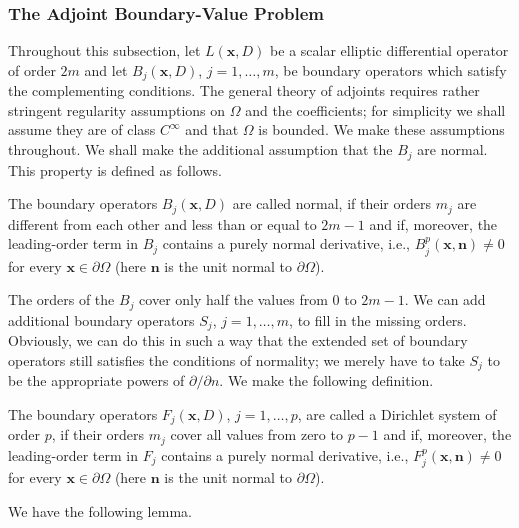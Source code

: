 \subsubsection{The Adjoint Boundary-Value Problem}\label{subsec:adjoint-boundary-value-problem}

Throughout this subsection, let $L(\bm{x},D)$ be a scalar elliptic differential operator of order $2m$ and let $B_j(\bm{x},D)$, $j=1,\ldots,m$, be boundary operators which satisfy the complementing conditions. The general theory of adjoints requires rather stringent regularity assumptions on $\Omega$ and the coefficients; for simplicity we shall assume they are of class $C^\infty$ and that $\Omega$ is bounded. We make these assumptions throughout. We shall make the additional assumption that the $B_j$ are normal. This property is defined as follows.

\begin{Definition}
\label{def:normal-boundary-operators}
The boundary operators $B_j(\bm{x},D)$ are called normal, if their orders $m_j$ are different from each other and less than or equal to $2m-1$ and if, moreover, the leading-order term in $B_j$ contains a purely normal derivative, i.e., $B_j^p(\bm{x},\bm{n})\ne0$ for every $\bm{x}\in\partial\Omega$ (here $\bm{n}$ is the unit normal to $\partial\Omega$).
\end{Definition}

The orders of the $B_j$ cover only half the values from $0$ to $2m-1$. We can add additional boundary operators $S_j$, $j=1,\ldots,m$, to fill in the missing orders. Obviously, we can do this in such a way that the extended set of boundary operators still satisfies the conditions of normality; we merely have to take $S_j$ to be the appropriate powers of $\partial/\partial n$. We make the following definition.

\begin{Definition}
\label{def:dirichlet-boundary-system}
The boundary operators $F_j(\bm{x},D)$, $j=1,\ldots,p$, are called a Dirichlet system of order $p$, if their orders $m_j$ cover all values from zero to $p-1$ and if, moreover, the leading-order term in $F_j$ contains a purely normal derivative, i.e., $F_j^p(\bm{x},\bm{n})\ne0$ for every $\bm{x}\in\partial\Omega$ (here $\bm{n}$ is the unit normal to $\partial\Omega$).
\end{Definition}

We have the following lemma.

